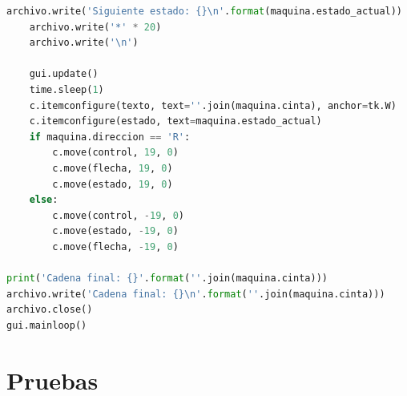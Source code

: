 \documentclass[a4paper,12pt]{article}
\begin{document}
\begin{lstlisting}[language=Python]
    archivo.write('Siguiente estado: {}\n'.format(maquina.estado_actual))
    archivo.write('*' * 20)
    archivo.write('\n')

    gui.update()
    time.sleep(1)
    c.itemconfigure(texto, text=''.join(maquina.cinta), anchor=tk.W)
    c.itemconfigure(estado, text=maquina.estado_actual)
    if maquina.direccion == 'R':
        c.move(control, 19, 0)
        c.move(flecha, 19, 0)
        c.move(estado, 19, 0)
    else:
        c.move(control, -19, 0)
        c.move(estado, -19, 0)
        c.move(flecha, -19, 0)

print('Cadena final: {}'.format(''.join(maquina.cinta)))
archivo.write('Cadena final: {}\n'.format(''.join(maquina.cinta)))
archivo.close()
gui.mainloop()
\end{lstlisting}

\section{Pruebas}
\end{document}
